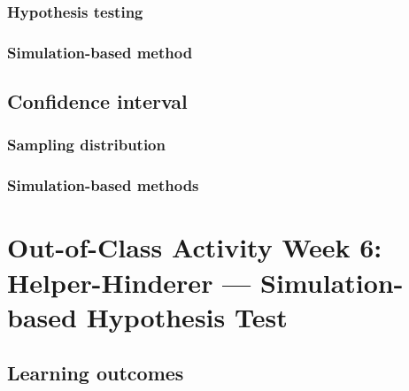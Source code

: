 \documentclass[
]{report}
\begin{document}
\hypertarget{hypothesis-testing-1}{%
\subsubsection*{Hypothesis testing}\label{hypothesis-testing-1}}

\hypertarget{simulation-based-method-1}{%
\subsubsection*{Simulation-based method}\label{simulation-based-method-1}}

\hypertarget{confidence-interval}{%
\subsection*{Confidence interval}\label{confidence-interval}}

\hypertarget{sampling-distribution}{%
\subsubsection*{Sampling distribution}\label{sampling-distribution}}

\hypertarget{simulation-based-methods}{%
\subsubsection*{Simulation-based methods}\label{simulation-based-methods}}

\hypertarget{out-of-class-activity-week-6-helper-hinderer-simulation-based-hypothesis-test}{%
\section{Out-of-Class Activity Week 6: Helper-Hinderer --- Simulation-based Hypothesis Test}\label{out-of-class-activity-week-6-helper-hinderer-simulation-based-hypothesis-test}}

\hypertarget{learning-outcomes-9}{%
\subsection{Learning outcomes}\label{learning-outcomes-9}}
\end{document}
